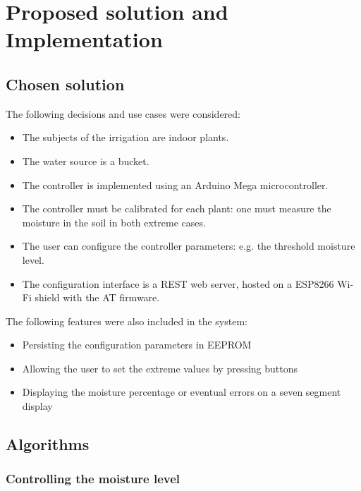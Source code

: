 \chapter{Proposed solution and Implementation} 

\section{Chosen solution}

The following decisions and use cases were considered:

\begin{itemize}
 \item The subjects of the irrigation are indoor plants.
 \item The water source is a bucket.
 \item The controller is implemented using an Arduino Mega microcontroller.
 \item The controller must be calibrated for each plant: one must measure the moisture in the soil in both extreme cases.
 \item The user can configure the controller parameters: e.g. the threshold moisture level.
 \item The configuration interface is a REST web server, hosted on a ESP8266 Wi-Fi shield with the AT firmware.
\end{itemize}

The following features were also included in the system:

\begin{itemize}
 \item Persisting the configuration parameters in EEPROM
 \item Allowing the user to set the extreme values by pressing buttons
 \item Displaying the moisture percentage or eventual errors on a seven segment display
\end{itemize}






\section{Algorithms}

\subsection{Controlling the moisture level}
\label{sec:control_fsm}

